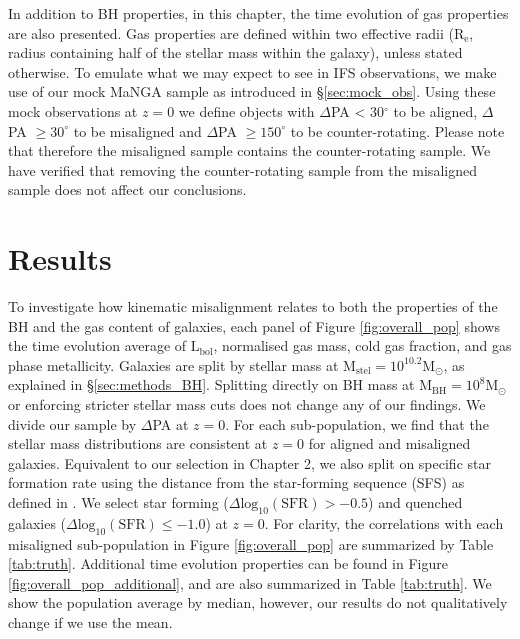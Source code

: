 In addition to BH properties, in this chapter, the time evolution of gas properties are also presented. Gas properties are defined within two effective radii ($\mathrm{R_{e}}$, radius containing half of the stellar mass within the galaxy), unless stated otherwise. To emulate what we may expect to see in IFS observations, we make use of our mock MaNGA sample as introduced in \S\ref{sec:mock_obs}. Using these mock observations at $z=0$ we define objects with $\Delta$PA < 30$^{\circ}$ to be aligned, $\Delta$PA $ \geq 30^{\circ}$ to be misaligned and $\Delta$PA $\geq 150^{\circ}$ to be counter-rotating. Please note that therefore the misaligned sample contains the counter-rotating sample. We have verified that removing the counter-rotating sample from the misaligned sample does not affect our conclusions.

\section{Results} \label{sec:results_BH}
To investigate how kinematic misalignment relates to both the properties of the BH and the gas content of galaxies, each panel of Figure \ref{fig:overall_pop} shows the time evolution average of $\mathrm{L_{bol}}$, normalised gas mass, cold gas fraction, and gas phase metallicity. Galaxies are split by stellar mass at $\mathrm{M_{stel} = 10^{10.2}M_{\odot}}$, as explained in \S\ref{sec:methods_BH}. Splitting directly on BH mass at $\mathrm{M_{BH} = 10^{8}M_{\odot}}$ or enforcing stricter stellar mass cuts does not change any of our findings. We divide our sample by $\Delta$PA at $z=0$. For each sub-population, we find that the stellar mass distributions are consistent at $z=0$ for aligned and misaligned galaxies. Equivalent to our selection in Chapter 2, we also split on specific star formation rate using the distance from the star-forming sequence (SFS) as defined in \citet{pillepich2019}. We select star forming ($\Delta \mathrm{log_{10}(SFR) > -0.5}$) and quenched galaxies ($\Delta \mathrm{log_{10}(SFR) \leq -1.0}$) at $z=0$. For clarity, the correlations with each misaligned sub-population in Figure \ref{fig:overall_pop} are summarized by Table \ref{tab:truth}. Additional time evolution properties can be found in Figure \ref{fig:overall_pop_additional}, and are also summarized in Table \ref{tab:truth}. We show the population average by median, however, our results do not qualitatively change if we use the mean.

